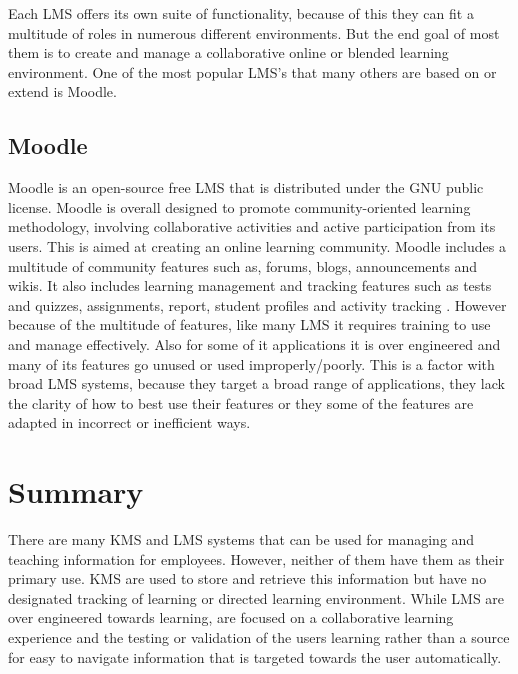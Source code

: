 Each LMS offers its own suite of functionality, because of this they can fit a multitude of roles in numerous different environments. But the end goal of most them is to create and manage a collaborative online or blended learning environment. One of the most popular LMS's that many others are based on or extend is Moodle.

\subsection{Moodle}
Moodle is an open-source free LMS that is distributed under the GNU public license. Moodle is overall designed to promote community-oriented learning methodology, involving collaborative activities and active participation from its users. This is aimed at creating an online learning community. Moodle includes a multitude of community features such as, forums, blogs, announcements and wikis. It also includes learning management and tracking features such as tests and quizzes, assignments, report, student profiles and activity tracking \cite{mcintosh2014vendors, muhsen2013moodle}. However because of the multitude of features, like many LMS it requires training to use and manage effectively. Also for some of it applications it is over engineered and many of its features go unused or used improperly/poorly. This is a factor with broad LMS systems, because they target a broad range of applications, they lack the clarity of how to best use their features or they some of the features are adapted in incorrect or inefficient ways.

\section{Summary}
There are many KMS and LMS systems that can be used for managing and teaching information for employees. However, neither of them have them as their primary use. KMS are used to store and retrieve this information but have no designated tracking of learning or directed learning environment. While LMS are over engineered towards learning, are focused on a collaborative learning experience and the testing or validation of the users learning rather than a source for easy to navigate information that is targeted towards the user automatically.